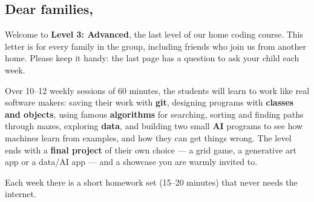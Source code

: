 \documentclass[level=3]{kidscode}
\begin{document}

\subsection{Dear families,}

Welcome to \textbf{Level 3: Advanced}, the last level of our home coding course. This letter is
for every family in the group, including friends who join us from another home. Please keep it
handy: the last page has a question to ask your child each week.

Over 10--12 weekly sessions of 60 minutes, the
students will learn to work like real software makers: saving their work with \textbf{git},
designing programs with \textbf{classes and objects}, using famous \textbf{algorithms} for
searching, sorting and finding paths through mazes, exploring \textbf{data}, and building two
small \textbf{AI} programs to see how machines learn from examples, and how they can get things
wrong. The level ends with a \textbf{final project} of their own choice --- a grid game, a
generative art app or a data/AI app --- and a showcase you are warmly invited to.

Each week there is a short homework set (15--20 minutes) that never needs the internet.
\end{document}

